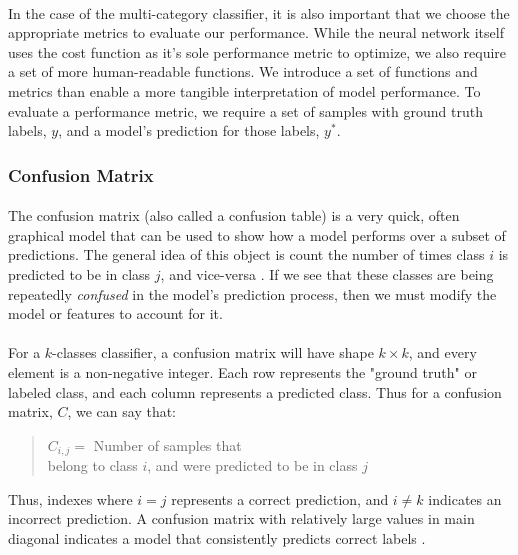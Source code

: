 \documentclass[12pt,letterpaper]{article}
\begin{document}
\paragraph*{}In the case of the multi-category classifier, it is also important that we choose the appropriate metrics to evaluate our performance. While the neural network itself uses the cost function as it's sole performance metric to optimize, we also require a set of more human-readable functions. We introduce a set of functions and metrics than enable a more tangible interpretation of model performance. 
To evaluate a performance metric, we require a set of samples with ground truth labels, $y$, and a model's prediction for those labels, $y^*$.


\subsubsection{Confusion Matrix}

\paragraph*{}The confusion matrix (also called a confusion table) is a very quick, often graphical model that can be used to show how a model performs over a subset of predictions. The general idea of this object is count the number of times class $i$ is predicted to be in class $j$, and vice-versa \cite{Geron}. If we see that these classes are being repeatedly \textit{confused} in the model's prediction process, then we must modify the model or features to account for it. 

\paragraph*{}For a $k$-classes classifier, a confusion matrix will have shape $k \times k$, and every element is a non-negative integer. Each row represents the "ground truth" or  labeled class, and each column represents a predicted class. Thus for a confusion matrix, $C$, we can say that:
\begin{quote}
\label{eqn-ConfMat}
\begin{center}
$C_{i,j} =$ Number of samples that \\ 
belong to class $i$, and were predicted to be in class $j$
\end{center}

\end{quote}
Thus, indexes where $i = j$ represents a correct prediction, and $i \neq k$ indicates an incorrect prediction. A confusion matrix with relatively large values in main diagonal indicates a model that consistently predicts correct labels \cite{Geron}. 
\end{document}

